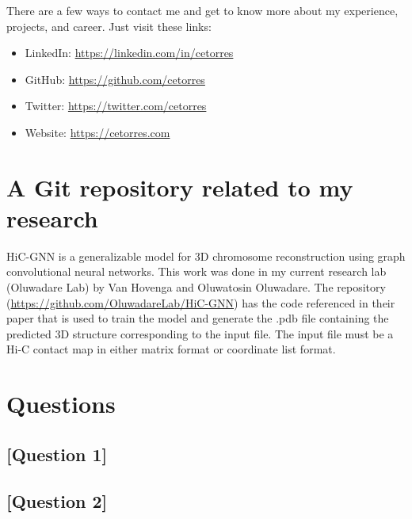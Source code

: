 There are a few ways to contact me and get to know more about my experience, projects, and career. Just visit these links:
\begin{itemize}
    \item LinkedIn: \url{https://linkedin.com/in/cetorres}
    \item GitHub: \url{https://github.com/cetorres}
    \item Twitter: \url{https://twitter.com/cetorres}
    \item Website: \url{https://cetorres.com}
\end{itemize}

\section{A Git repository related to my research}

HiC-GNN is a generalizable model for 3D chromosome reconstruction using graph convolutional neural networks. This work was done in my current research lab (Oluwadare Lab) by Van Hovenga and Oluwatosin Oluwadare. The repository (\url{https://github.com/OluwadareLab/HiC-GNN}) has the code referenced in their paper that is used to train the model and generate the .pdb file containing the predicted 3D structure corresponding to the input file. The input file must be a Hi-C contact map in either matrix format or coordinate list format.


\section{Questions}

\subsection{[Question 1]}

\subsection{[Question 2]}

